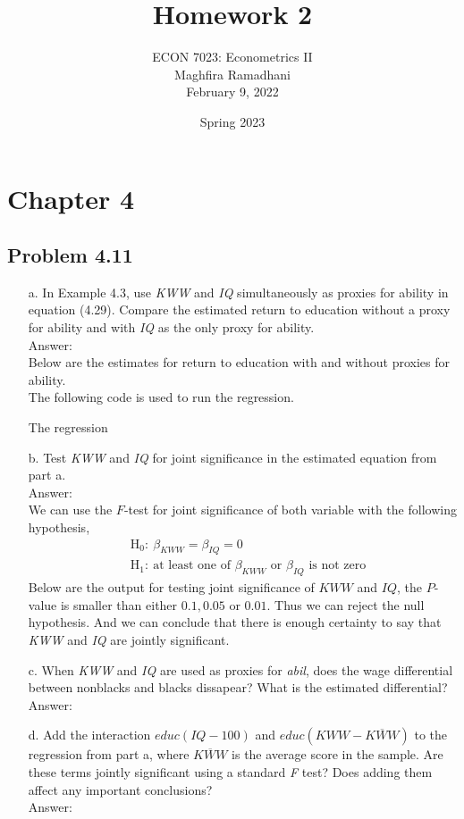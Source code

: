 \documentclass[10pt]{article}
\begin{document}
 
\title{Homework 2}
\author{ECON 7023: Econometrics II\\
Maghfira Ramadhani\\
February 9, 2022}
\date{Spring 2023}
\maketitle

\section*{Chapter 4}
\subsection*{Problem 4.11}
\begin{enumerate}
\item[a.] In Example 4.3, use \textit{KWW} and \textit{IQ} simultaneously as proxies for ability in equation (4.29). Compare the estimated return to education without a proxy for ability and with \textit{IQ} as the only proxy for ability.
\\ Answer: \\
Below are the estimates for return to education with and without proxies for ability.
\\
The following code is used to run the regression.

The regression 

\item[b.] Test \textit{KWW} and \textit{IQ} for joint significance in the estimated equation from part a.
\\ Answer:\\
We can use the $F$-test for joint significance of both variable with the following hypothesis,
\begin{align*}
    &\text{H}_0:\ \beta_{KWW}=\beta_{IQ}=0\\
    &\text{H}_1:\ \text{at least one of }\beta_{KWW}\text{ or }\beta_{IQ} \text{ is not zero}
\end{align*}
Below are the output for testing joint significance of $KWW$ and $IQ$, the $P$-value is smaller than either $0.1, 0.05$ or $0.01$. Thus we can reject the null hypothesis. And we can conclude that there is enough certainty to say that \textit{KWW} and \textit{IQ} are jointly significant.
\\


\item[c.] When \textit{KWW} and \textit{IQ} are used as proxies for \textit{abil}, does the wage differential between nonblacks and blacks dissapear? What is the estimated differential?
\\ Answer:\\

\item[d.] Add the interaction $educ(IQ-100)$ and $educ(KWW-\overline{KWW})$ to the regression from part a, where $\overline{KWW}$ is the average score in the sample. Are these terms jointly significant using a standard \textit{F} test? Does adding them affect any important conclusions?
\\ Answer:\\
\end{enumerate}
\end{document}
